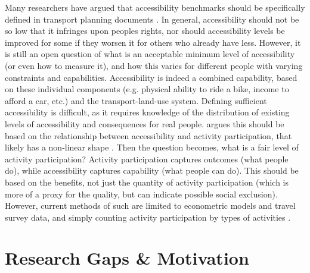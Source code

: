 Many researchers have argued that accessibility benchmarks should be specifically defined in transport planning documents \cite{manaugh_integrating_2015, allen_benchmarking_2019}. In general, accessibility should not be so low that it infringes upon peoples rights, nor should accessibility levels be improved for some if they worsen it for others who already have less. However, it is still an open question of what is an acceptable minimum level of accessibility  (or even how to measure it), and how this varies for different people with varying constraints and capabilities. Accessibility is indeed a combined capability, based on these individual components (e.g. physical ability to ride a bike, income to afford a car, etc.) and the transport-land-use system. Defining sufficient accessibility is difficult, as it requires knowledge of the distribution of existing levels of accessibility and consequences for real people.  argues this should be based on the relationship between accessibility and activity participation, that likely has a non-linear shape \cite{allen_planning_2020}.  Then the question becomes, what is a fair level of activity participation? Activity participation captures outcomes (what people do), while accessibility captures capability (what people can do). This should be based on the benefits, not just the quantity of activity participation (which is more of a proxy for the quality, but can indicate possible social exclusion).  However, current methods of such are limited to econometric models and travel survey data, and simply counting activity participation by types of activities \cite{fransen_spatio-temporal_2018,allen_planning_2020}. 




\section{Research Gaps \& Motivation}

